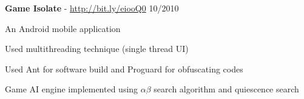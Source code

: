 \documentclass[margin,line]{resume}
\begin{document}
\begin{resume}
    \textbf{Game Isolate} - \url{http://bit.ly/eiooQ0} \hfill 10/2010 \vspace{-3mm}\\\vspace{-1mm}%
      \begin{list2}
       \item An Android mobile application
       \item Used multithreading technique (single thread UI)
       \item Used Ant for software build and Proguard for obfuscating codes
       \item Game AI engine implemented using $\alpha \beta$ search algorithm and quiescence search
      \end{list2}

\end{resume}
\end{document}
